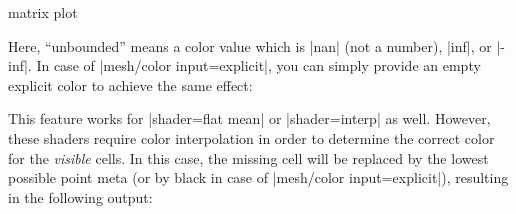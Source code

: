 {\begin{plottype}[/pgfplots]{matrix plot}
\begin{codeexample}[]
\end{codeexample}
    Here, ``unbounded'' means a color value which is |nan| (not a number),
    |inf|, or |-inf|. In case of |mesh/color input=explicit|, you can simply
    provide an empty explicit color to achieve the same effect:
\begin{codeexample}[]
\end{codeexample}
    This feature works for |shader=flat mean| or |shader=interp| as well.
    However, these shaders require color interpolation in order to determine
    the correct color for the \emph{visible} cells. In this case, the missing
    cell will be replaced by the lowest possible point meta (or by black in
    case of |mesh/color input=explicit|), resulting in the following output:
\begin{codeexample}[]
\end{codeexample}


\end{plottype}}
